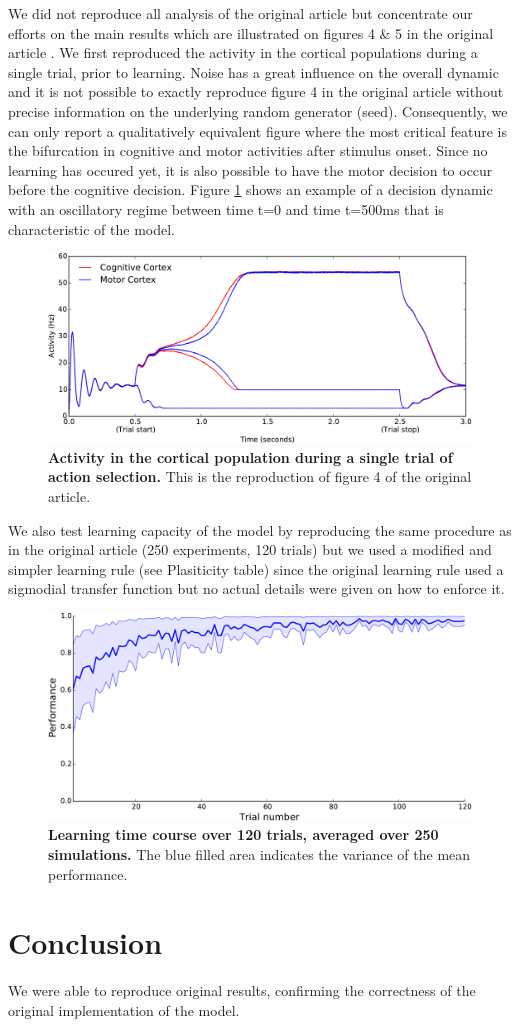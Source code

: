 We did not reproduce all analysis of the original article but concentrate our
efforts on the main results which are illustrated on figures 4 \& 5 in the
original article \cite{Guthrie:2013}. We first reproduced the activity in the
cortical populations during a single trial, prior to learning. Noise has a
great influence on the overall dynamic and it is not possible to exactly
reproduce figure 4 in the original article without precise information on the
underlying random generator (seed). Consequently, we can only report a
qualitatively equivalent figure where the most critical feature is the
bifurcation in cognitive and motor activities after stimulus onset.  Since no
learning has occured yet, it is also possible to have the motor decision to
occur before the cognitive decision. Figure \ref{fig:1} shows an example of a
decision dynamic with an oscillatory regime between time t=0 and time t=500ms
that is characteristic of the model.
%
\begin{figure}[htbp]
  \centering
  \includegraphics[width=\columnwidth]{./figure-1.pdf}
  \caption{\textbf{Activity in the cortical population during a single
      trial of action selection.} This is the reproduction of figure 4 of the
    original article.}
  \label{fig:1}
\end{figure}
%
We also test learning capacity of the model by reproducing the same
procedure as in the original article (250 experiments, 120 trials) but
we used a modified and simpler learning rule (see Plasiticity table)
since the original learning rule used a sigmodial transfer function but
no actual details were given on how to enforce it.
%
\begin{figure}[htbp]
  \centering
  \includegraphics[width=\textwidth]{./figure-2.pdf}
  \caption{\textbf{Learning time course over 120 trials, averaged over 250
      simulations.} The blue filled area indicates the variance of the mean
    performance.}
\end{figure}

\section* {Conclusion}

We were able to reproduce original results, confirming the correctness of the
original implementation of the model.
